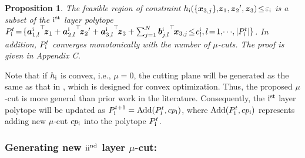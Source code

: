 \documentclass[letterpaper]{article} %
\newtheorem{prop}{Proposition}
\begin{document}
\begin{prop}
\label{prop:1}
The feasible region of constraint $h_{\rm{\uppercase\expandafter{\romannumeral1}}}(\{{\boldsymbol{x}_{3,j}}\},\!\boldsymbol{z}_1, {\boldsymbol{z}_2}',\boldsymbol{z}_3 )\! \le \! \varepsilon_{\rm{\uppercase\expandafter{\romannumeral1}}}$  is a subset of the ${\rm{\uppercase\expandafter{\romannumeral1}}}^{\rm{st}}$ layer polytope  $P_{\rm{\uppercase\expandafter{\romannumeral1}}}^{t}\!=\! \{{\boldsymbol{a}_{1,l}^{\rm{\uppercase\expandafter{\romannumeral1}}}}^{\top}\!{\boldsymbol{z}_1} + {\boldsymbol{a}_{2,l}^{\rm{\uppercase\expandafter{\romannumeral1}}}}^{\top}\!{\boldsymbol{z}_2}' + {\boldsymbol{a}_{3,l}^{\rm{\uppercase\expandafter{\romannumeral1}}}}^{\top}\!{\boldsymbol{z}_3} + \sum\nolimits_{j = 1}^N {\boldsymbol{b}{{_{j,l}^{\rm{\uppercase\expandafter{\romannumeral1}}}}}}^{\top}\!{\boldsymbol{x}_{3,j}}  \!\le\! c_l^{\rm{\uppercase\expandafter{\romannumeral1}}},l \!=\! 1,\! \cdots\! ,|P_{\rm{\uppercase\expandafter{\romannumeral1}}}^{t}| \}$. In addition, $P_{\rm{\uppercase\expandafter{\romannumeral1}}}^{t}$ converges monotonically with the number of $\mu$-cuts. The proof is given in Appendix C.
\end{prop}


Note that if $h_{\rm{\uppercase\expandafter{\romannumeral1}}}$ is convex, i.e., $\mu=0$, the cutting plane will be generated as the same as that in \cite{franc2011cutting,jiao2022asynchronous}, which is designed for convex optimization. Thus, the proposed $\mu$-cut is more general than prior work in the literature. Consequently, the ${\rm{\uppercase\expandafter{\romannumeral1}}}^{\rm{st}}$ layer polytope will be updated as
${P_{\rm{\uppercase\expandafter{\romannumeral1}}}^{t + 1}} = {\rm{Add}}({P_{\rm{\uppercase\expandafter{\romannumeral1}}}^{t}},{cp_{\rm{\uppercase\expandafter{\romannumeral1}}}})$,
where ${\rm{Add}}({P_{\rm{\uppercase\expandafter{\romannumeral1}}}^{t}},{cp_{\rm{\uppercase\expandafter{\romannumeral1}}}})$ represents adding new $\mu$-cut ${cp_{\rm{\uppercase\expandafter{\romannumeral1}}}}$ into the polytope ${P_{\rm{\uppercase\expandafter{\romannumeral1}}}^{t}}$.


\subsubsection{Generating new ${\rm{\uppercase\expandafter{\romannumeral2}}}^{\rm{nd}}$ layer $\mu$-cut:}
\end{document}
